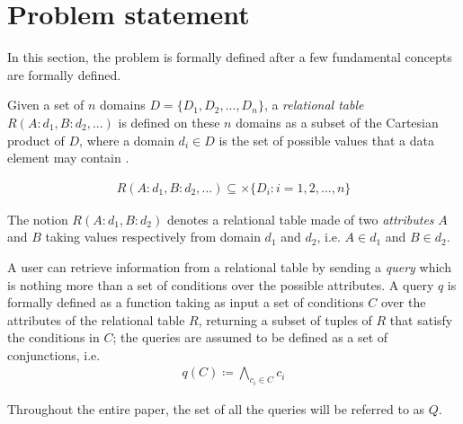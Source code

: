 \section{Problem statement}
\label{problem_statement}

In this section, the problem is formally defined after a few fundamental concepts are formally defined.

\begin{definition}
    Given a set of $n$ domains $D = \{D_1, D_2, ..., D_n\}$, a \emph{relational table} $R(A:d_1, B:d_2, ...)$ is defined on these $n$ domains as a subset of the Cartesian product of $D$, where a domain $d_i \in D$ is the set of possible values that a data element may contain \cite{codd_db}.

    \begin{equation}
    \begin{aligned}
    R(A:d_1, B:d_2, ...) \subseteq \times \{D_i : i=1, 2, ..., n \}
    \end{aligned}
    \end{equation}
    
    The notion $R(A:d_1, B:d_2)$ denotes a relational table made of two \emph{attributes} $A$ and $B$ taking values respectively from domain $d_1$ and $d_2$, i.e. $A \in d_1$ and $B \in d_2$. 

\end{definition}

\begin{definition}[Query]   \label{def:query}
    A user can retrieve information from a relational table by sending a \emph{query} which is nothing more than a set of conditions over the possible attributes. A query $q$ is formally defined as a function taking as input a set of conditions $C$ over the attributes of the relational table $R$, returning a subset of tuples of $R$ that satisfy the conditions in $C$; the queries are assumed to be defined as a set of conjunctions, i.e. 
    \begin{equation}
    \begin{aligned}
    q(C) \coloneqq \bigwedge_{c_i \in C} c_i
    \end{aligned}
    \end{equation}
        
    Throughout the entire paper, the set of all the queries will be referred to as $Q$. 
    
\end{definition}

